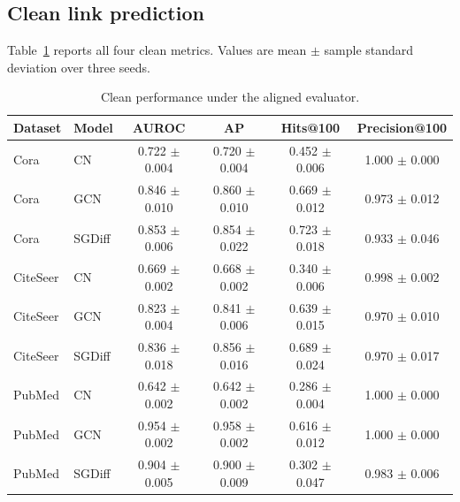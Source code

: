 \subsection{Clean link prediction}
Table~\ref{tab:clean} reports all four clean metrics. Values are mean $\pm$ sample standard deviation over three seeds.
\begin{table}[H]
\centering
\small
\begin{tabular}{llcccc}
\toprule
Dataset & Model & AUROC & AP & Hits@100 & Precision@100 \\
\midrule
Cora & CN & 0.722 $\pm$ 0.004 & 0.720 $\pm$ 0.004 & 0.452 $\pm$ 0.006 & 1.000 $\pm$ 0.000 \\
Cora & GCN & 0.846 $\pm$ 0.010 & 0.860 $\pm$ 0.010 & 0.669 $\pm$ 0.012 & 0.973 $\pm$ 0.012 \\
Cora & SGDiff & 0.853 $\pm$ 0.006 & 0.854 $\pm$ 0.022 & 0.723 $\pm$ 0.018 & 0.933 $\pm$ 0.046 \\
\addlinespace
CiteSeer & CN & 0.669 $\pm$ 0.002 & 0.668 $\pm$ 0.002 & 0.340 $\pm$ 0.006 & 0.998 $\pm$ 0.002 \\
CiteSeer & GCN & 0.823 $\pm$ 0.004 & 0.841 $\pm$ 0.006 & 0.639 $\pm$ 0.015 & 0.970 $\pm$ 0.010 \\
CiteSeer & SGDiff & 0.836 $\pm$ 0.018 & 0.856 $\pm$ 0.016 & 0.689 $\pm$ 0.024 & 0.970 $\pm$ 0.017 \\
\addlinespace
PubMed & CN & 0.642 $\pm$ 0.002 & 0.642 $\pm$ 0.002 & 0.286 $\pm$ 0.004 & 1.000 $\pm$ 0.000 \\
PubMed & GCN & 0.954 $\pm$ 0.002 & 0.958 $\pm$ 0.002 & 0.616 $\pm$ 0.012 & 1.000 $\pm$ 0.000 \\
PubMed & SGDiff & 0.904 $\pm$ 0.005 & 0.900 $\pm$ 0.009 & 0.302 $\pm$ 0.047 & 0.983 $\pm$ 0.006 \\
\bottomrule
\end{tabular}
\caption{Clean performance under the aligned evaluator.}
\label{tab:clean}
\end{table}

